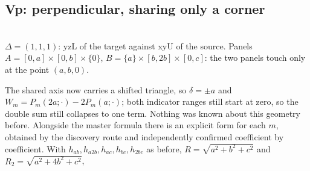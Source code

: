\documentclass[11pt]{article}
\theoremstyle{remark}
\newcommand{\geofig}[2]{\begin{center}#1\\[2pt]{\footnotesize #2}\end{center}}
\begin{document}
\subsection{Vp: perpendicular, sharing only a corner}
\label{sec:Vp}

\geofig{\figVp}{$\Delta = (1,1,1)$: yzL of the target against xyU of the source. Panels
$A = [0,a]\times[0,b]\times\{0\}$, $B = \{a\}\times[b,2b]\times[0,c]$: the two panels
touch only at the point $(a,b,0)$.}

The shared axis now carries a shifted triangle, so $\delta = \pm a$ and
$W_m = P_m(2a;\cdot) - 2P_m(a;\cdot)$; both indicator ranges still start at zero, so the
double sum still collapses to one term. Nothing was known about this geometry before.
Alongside the master formula there is an explicit form for each $m$, obtained by the
discovery route and independently confirmed coefficient by coefficient. With
$h_{ab},h_{a2b},h_{ac},h_{bc},h_{2bc}$ as before, $R = \sqrt{a^2+b^2+c^2}$ and
$R_2 = \sqrt{a^2+4b^2+c^2}$,
\end{document}

